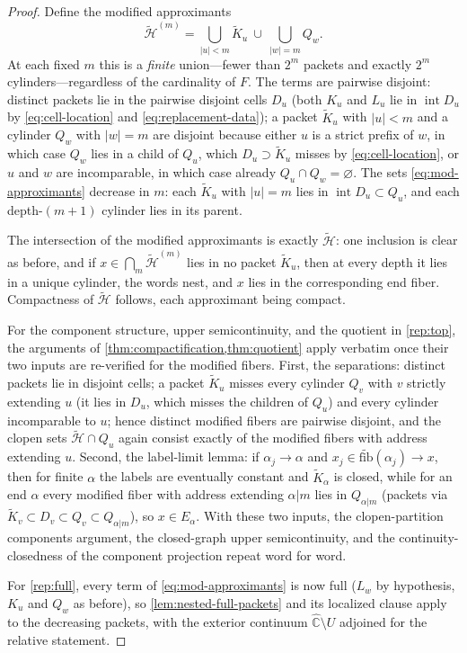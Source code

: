 \documentclass[11pt,reqno]{amsart}
\numberwithin{equation}{section}
\theoremstyle{plain}
\theoremstyle{definition}
\theoremstyle{remark}
\newcommand{\Chat}{\widehat{\mathbb C}}
\begin{document}
\begin{proof}
Define the modified approximants
\begin{equation}
 \widetilde{\mathcal H}^{(m)}
 =
 \bigcup_{|u|<m}\widetilde K_u
 \ \cup\
 \bigcup_{|w|=m}Q_w .
\label{eq:mod-approximants}
\end{equation}
At each fixed $m$ this is a \emph{finite} union---fewer than $2^m$
packets and exactly $2^m$ cylinders---regardless of the cardinality of
$F$.  The terms are pairwise disjoint: distinct packets lie in the
pairwise disjoint cells $D_u$ (both $K_u$ and $L_u$ lie in
$\operatorname{int}D_u$ by \eqref{eq:cell-location} and
\eqref{eq:replacement-data}); a packet $\widetilde K_u$ with $|u|<m$
and a cylinder $Q_w$ with $|w|=m$ are disjoint because either $u$ is a
strict prefix of $w$, in which case $Q_w$ lies in a child of $Q_u$,
which $D_u\supset\widetilde K_u$ misses by \eqref{eq:cell-location}, or
$u$ and $w$ are incomparable, in which case already
$Q_u\cap Q_w=\varnothing$.  The sets \eqref{eq:mod-approximants}
decrease in $m$: each $\widetilde K_u$ with $|u|=m$ lies in
$\operatorname{int}D_u\subset Q_u$, and each depth-$(m{+}1)$ cylinder
lies in its parent.

The intersection of the modified approximants is exactly
$\widetilde{\mathcal H}$: one inclusion is clear as before, and if
$x\in\bigcap_m\widetilde{\mathcal H}^{(m)}$ lies in no packet
$\widetilde K_u$, then at every depth it lies in a unique cylinder,
the words nest, and $x$ lies in the corresponding end fiber.
Compactness of $\widetilde{\mathcal H}$ follows, each approximant being
compact.

For the component structure, upper semicontinuity, and the quotient in
\ref{rep:top}, the arguments of
\cref{thm:compactification,thm:quotient} apply verbatim once their two
inputs are re-verified for the modified fibers.  First, the
separations: distinct packets lie in disjoint cells; a packet
$\widetilde K_u$ misses every cylinder $Q_v$ with $v$ strictly
extending $u$ (it lies in $D_u$, which misses the children of $Q_u$)
and every cylinder incomparable to $u$; hence distinct modified fibers
are pairwise disjoint, and the clopen sets
$\widetilde{\mathcal H}\cap Q_u$ again consist exactly of the modified
fibers with address extending $u$.  Second, the label-limit lemma: if
$\alpha_j\to\alpha$ and
$x_j\in\widetilde{\mathrm{fib}}(\alpha_j)\to x$, then for finite
$\alpha$ the labels are eventually constant and
$\widetilde K_\alpha$ is closed, while for an end $\alpha$ every
modified fiber with address extending $\alpha|m$ lies in
$Q_{\alpha|m}$ (packets via
$\widetilde K_v\subset D_v\subset Q_v\subset Q_{\alpha|m}$), so
$x\in E_\alpha$.  With these two inputs, the clopen-partition
components argument, the closed-graph upper semicontinuity, and the
continuity-closedness of the component projection repeat word for
word.

For \ref{rep:full}, every term of \eqref{eq:mod-approximants} is now
full ($L_w$ by hypothesis, $K_u$ and $Q_w$ as before), so
\cref{lem:nested-full-packets} and its localized clause apply to the
decreasing packets, with the exterior continuum $\Chat\setminus U$
adjoined for the relative statement.
\end{proof}
\end{document}
